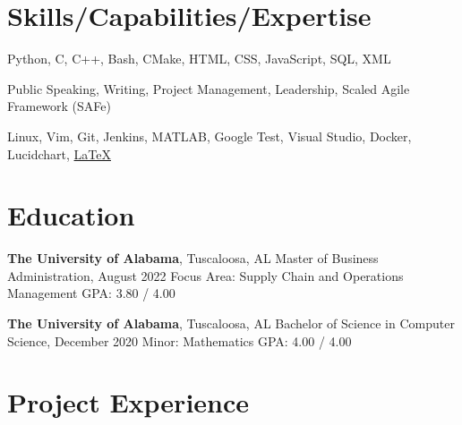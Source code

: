 \documentclass[hidelinks, 11pt]{article}
\begin{document}
\makecvtitle
\vspace{0.5mm}

\section{Skills/Capabilities/Expertise}

\begin{description}[widest=Programming Langauges:]
  \item[Programming Languages\normalfont:] Python, C, C++, Bash, CMake, HTML, CSS, JavaScript, SQL, XML
  \item[Soft Skills\normalfont:] Public Speaking, Writing, Project Management, Leadership, Scaled Agile Framework (SAFe)
  \item[Tools\normalfont:]	 Linux, Vim, Git, Jenkins, MATLAB, Google Test, Visual Studio, Docker, Lucidchart, \color{blue}\href{https://github.com/chwerth/LaTeX\_Resume}{LaTeX}
\end{description}

\section{Education}
\vspace{-1.4mm}
\begin{multicols}{2}

  \begin{minipage}{0.5\textwidth}
    \textbf{The University of Alabama}, Tuscaloosa, AL \newline
    Master of Business Administration, August 2022 \newline
    Focus Area: Supply Chain and Operations Management \newline
    GPA: 3.80 / 4.00
  \end{minipage}

  \begin{minipage}{0.5\textwidth}
    \textbf{The University of Alabama}, Tuscaloosa, AL \newline
    Bachelor of Science in Computer Science, December 2020 \newline
    Minor: Mathematics \newline
    GPA: 4.00 / 4.00
  \end{minipage}

\end{multicols}

\section{Project Experience}
\end{document}
